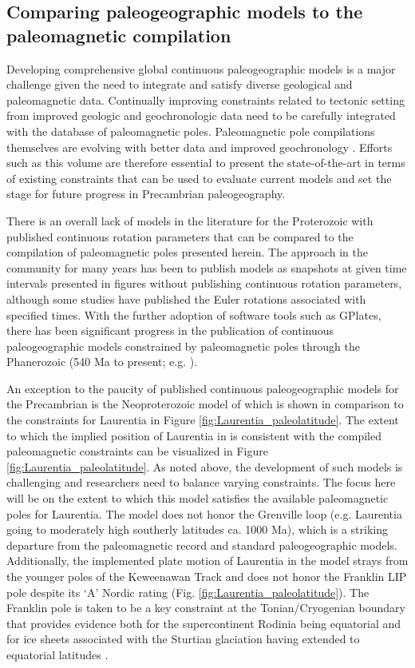 \documentclass[twocolumn, switch]{article} %
\begin{document}
\subsection{Comparing paleogeographic models to the paleomagnetic compilation}

Developing comprehensive global continuous paleogeographic models is a major challenge given the need to integrate and satisfy diverse geological and paleomagnetic data. Continually improving constraints related to tectonic setting from improved geologic and geochronologic data need to be carefully integrated with the database of paleomagnetic poles. Paleomagnetic pole compilations themselves are evolving with better data and improved geochronology \citep{Evans2021a}. Efforts such as this volume are therefore essential to present the state-of-the-art in terms of existing constraints that can be used to evaluate current models and set the stage for future progress in Precambrian paleogeography.

There is an overall lack of models in the literature for the Proterozoic with published continuous rotation parameters that can be compared to the compilation of paleomagnetic poles presented herein. The approach in the community for many years has been to publish models as snapshots at given time intervals presented in figures without publishing continuous rotation parameters, although some studies have published the Euler rotations associated with specified times. With the further adoption of software tools such as GPlates, there has been significant progress in the publication of continuous paleogeographic models constrained by paleomagnetic poles through the Phanerozoic (540 Ma to present; e.g. \citealp{Torsvik2017a}).

An exception to the paucity of published continuous paleogeographic models for the Precambrian is the Neoproterozoic model of \cite{Merdith2017b} which is shown in comparison to the constraints for Laurentia in Figure \ref{fig:Laurentia_paleolatitude}. The extent to which the implied position of Laurentia in \cite{Merdith2017b} is consistent with the compiled paleomagnetic constraints can be visualized in Figure \ref{fig:Laurentia_paleolatitude}. As noted above, the development of such models is challenging and  researchers need to balance varying constraints. The focus here will be on the extent to which this model satisfies the available paleomagnetic poles for Laurentia. The model does not honor the Grenville loop (e.g. Laurentia going to moderately high southerly latitudes ca. 1000 Ma), which is a striking departure from the paleomagnetic record and standard paleogeographic models. Additionally, the implemented plate motion of Laurentia in the \cite{Merdith2017b} model strays from the younger poles of the Keweenawan Track and does not honor the Franklin LIP pole \citep{Denyszyn2009b} despite its `A' Nordic rating (Fig. \ref{fig:Laurentia_paleolatitude}). The Franklin pole is taken to be a key constraint at the Tonian/Cryogenian boundary that provides evidence both for the supercontinent Rodinia being equatorial and for ice sheets associated with the Sturtian glaciation having extended to equatorial latitudes \citep{Macdonald2010a}.
\end{document}
